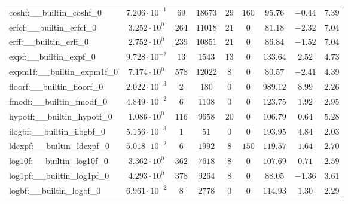 \begin{tabular}{|l|c|c|c|c|c|c|c|c|}
coshf:\_\_builtin\_coshf\_0               & $ 7.206 \cdot 10^{-1} $ & $ 69     $ & $ 18673  $ & $ 29  $ & $ 160  $ & $ 95.76       $ & $ -0.44   $ & $ 7.39    $ \\
erfcf:\_\_builtin\_erfcf\_0               & $ 3.252 \cdot 10^{0}  $ & $ 264    $ & $ 11018  $ & $ 21  $ & $ 0    $ & $ 81.18       $ & $ -2.32   $ & $ 7.04    $ \\
erff:\_\_builtin\_erff\_0                 & $ 2.752 \cdot 10^{0}  $ & $ 239    $ & $ 10851  $ & $ 21  $ & $ 0    $ & $ 86.84       $ & $ -1.52   $ & $ 7.04    $ \\
expf:\_\_builtin\_expf\_0                 & $ 9.728 \cdot 10^{-2} $ & $ 13     $ & $ 1543   $ & $ 13  $ & $ 0    $ & $ 133.64      $ & $ 2.52    $ & $ 4.73    $ \\
expm1f:\_\_builtin\_expm1f\_0             & $ 7.174 \cdot 10^{0}  $ & $ 578    $ & $ 12022  $ & $ 8   $ & $ 0    $ & $ 80.57       $ & $ -2.41   $ & $ 4.39    $ \\
floorf:\_\_builtin\_floorf\_0             & $ 2.022 \cdot 10^{-3} $ & $ 2      $ & $ 180    $ & $ 0   $ & $ 0    $ & $ 989.12      $ & $ 8.99    $ & $ 2.26    $ \\
fmodf:\_\_builtin\_fmodf\_0               & $ 4.849 \cdot 10^{-2} $ & $ 6      $ & $ 1108   $ & $ 0   $ & $ 0    $ & $ 123.75      $ & $ 1.92    $ & $ 2.95    $ \\
hypotf:\_\_builtin\_hypotf\_0             & $ 1.086 \cdot 10^{0}  $ & $ 116    $ & $ 9658   $ & $ 20  $ & $ 0    $ & $ 106.79      $ & $ 0.64    $ & $ 5.28    $ \\
ilogbf:\_\_builtin\_ilogbf\_0             & $ 5.156 \cdot 10^{-3} $ & $ 1      $ & $ 51     $ & $ 0   $ & $ 0    $ & $ 193.95      $ & $ 4.84    $ & $ 2.03    $ \\
ldexpf:\_\_builtin\_ldexpf\_0             & $ 5.018 \cdot 10^{-2} $ & $ 6      $ & $ 1992   $ & $ 8   $ & $ 150  $ & $ 119.57      $ & $ 1.64    $ & $ 2.70    $ \\
log10f:\_\_builtin\_log10f\_0             & $ 3.362 \cdot 10^{0}  $ & $ 362    $ & $ 7618   $ & $ 8   $ & $ 0    $ & $ 107.69      $ & $ 0.71    $ & $ 2.59    $ \\
log1pf:\_\_builtin\_log1pf\_0             & $ 4.293 \cdot 10^{0}  $ & $ 378    $ & $ 9264   $ & $ 8   $ & $ 0    $ & $ 88.05       $ & $ -1.36   $ & $ 3.61    $ \\
logbf:\_\_builtin\_logbf\_0               & $ 6.961 \cdot 10^{-2} $ & $ 8      $ & $ 2778   $ & $ 0   $ & $ 0    $ & $ 114.93      $ & $ 1.30    $ & $ 2.29    $ \\

\end{tabular}
